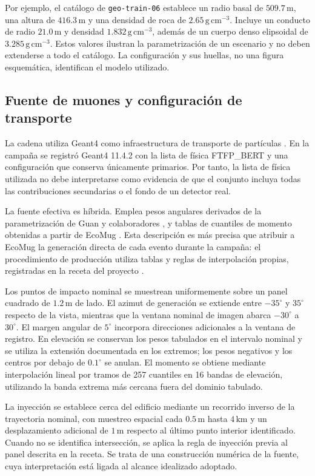 \documentclass[11pt,a4paper]{article}
\begin{document}
Por ejemplo, el catálogo de \texttt{geo-train-06} establece un radio basal de $509.7\,\mathrm m$, una altura de $416.3\,\mathrm m$ y una densidad de roca de $2.65\,\mathrm{g\,cm^{-3}}$. Incluye un conducto de radio $21.0\,\mathrm m$ y densidad $1.832\,\mathrm{g\,cm^{-3}}$, además de un cuerpo denso elipsoidal de $3.285\,\mathrm{g\,cm^{-3}}$. Estos valores ilustran la parametrización de un escenario y no deben extenderse a todo el catálogo. La configuración y sus huellas, no una figura esquemática, identifican el modelo utilizado.

\subsection{Fuente de muones y configuración de transporte}

La cadena utiliza Geant4 como infraestructura de transporte de partículas \cite{agostinelli2003}. En la campaña se registró Geant4 11.4.2 con la lista de física FTFP\_BERT y una configuración que conserva únicamente primarios. Por tanto, la lista de física utilizada no debe interpretarse como evidencia de que el conjunto incluya todas las contribuciones secundarias o el fondo de un detector real.

La fuente efectiva es híbrida. Emplea pesos angulares derivados de la parametrización de Guan y colaboradores \cite{guan2015}, y tablas de cuantiles de momento obtenidas a partir de EcoMug \cite{pagano2021}. Esta descripción es más precisa que atribuir a EcoMug la generación directa de cada evento durante la campaña: el procedimiento de producción utiliza tablas y reglas de interpolación propias, registradas en la receta del proyecto \cite{receta}.

Los puntos de impacto nominal se muestrean uniformemente sobre un panel cuadrado de $1.2\,\mathrm m$ de lado. El azimut de generación se extiende entre $-35^\circ$ y $35^\circ$ respecto de la vista, mientras que la ventana nominal de imagen abarca $-30^\circ$ a $30^\circ$. El margen angular de $5^\circ$ incorpora direcciones adicionales a la ventana de registro. En elevación se conservan los pesos tabulados en el intervalo nominal y se utiliza la extensión documentada en los extremos; los pesos negativos y los centros por debajo de $0.1^\circ$ se anulan. El momento se obtiene mediante interpolación lineal por tramos de 257 cuantiles en 16 bandas de elevación, utilizando la banda extrema más cercana fuera del dominio tabulado.

La inyección se establece cerca del edificio mediante un recorrido inverso de la trayectoria nominal, con muestreo espacial cada $0.5\,\mathrm m$ hasta $4\,\mathrm{km}$ y un desplazamiento adicional de $1\,\mathrm m$ respecto al último punto interior identificado. Cuando no se identifica intersección, se aplica la regla de inyección previa al panel descrita en la receta. Se trata de una construcción numérica de la fuente, cuya interpretación está ligada al alcance idealizado adoptado.
\end{document}
